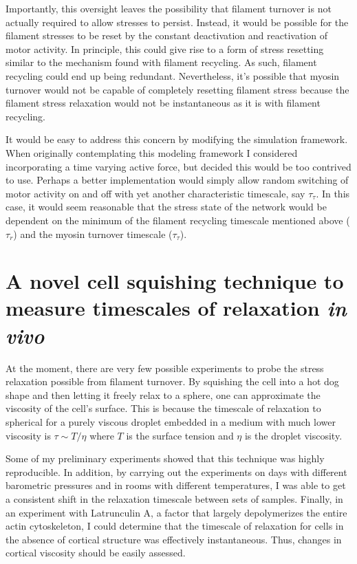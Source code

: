 Importantly, this oversight leaves the possibility that filament turnover is not actually required to allow stresses to persist.  Instead, it would be possible for the filament stresses to be reset by the constant deactivation and reactivation of motor activity.  In principle, this could give rise to a form of stress resetting similar to the mechanism found with filament recycling.  As such, filament recycling could end up being redundant.  Nevertheless, it's possible that myosin turnover would not be capable of completely resetting filament stress because the filament stress relaxation would not be instantaneous as it is with filament recycling.

It would be easy to address this concern by modifying the simulation framework.  When originally contemplating this modeling framework I considered incorporating a time varying active force, but decided this would be too contrived to use.  Perhaps a better implementation would simply allow random switching of motor activity on and off with yet another characteristic timescale, say $\tau_\tau$.  In this case, it would seem reasonable that the stress state of the network would be dependent on the minimum of the filament recycling timescale mentioned above ($\tau_r$) and the myosin turnover timescale ($\tau_\tau$).



\section{A novel cell squishing technique to measure timescales of relaxation \textit{in vivo}}

At the moment, there are very few possible experiments to probe the stress relaxation possible from filament turnover.  By squishing the cell into a hot dog shape and then letting it freely relax to a sphere, one can approximate the viscosity of the cell's surface.  This is because the timescale of relaxation to spherical for a purely viscous droplet embedded in a medium with much lower viscosity is $\tau \sim T/\eta$ where $T$ is the surface tension and $\eta$ is the droplet viscosity.  

Some of my preliminary experiments showed that this technique was highly reproducible.  In addition, by carrying out the experiments on days with different barometric pressures and in rooms with different temperatures, I was able to get a consistent shift in the relaxation timescale between sets of samples.  Finally, in an experiment with Latrunculin A, a factor that largely depolymerizes the entire actin cytoskeleton, I could determine that the timescale of relaxation for cells in the absence of cortical structure was effectively instantaneous.  Thus, changes in cortical viscosity should be easily assessed.  

